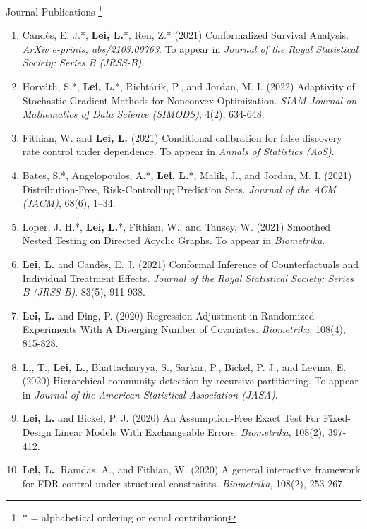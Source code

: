 \documentclass{article}
\begin{document}
\vspace{3mm}

\begin{large}
\noindent Journal Publications \footnote{$\ast$ = alphabetical ordering or equal contribution}
\end{large}

\begin{enumerate}
\item Cand\`{e}s, E. J.*, \textbf{Lei, L.}*, Ren, Z.* (2021) Conformalized Survival Analysis. \emph{ArXiv e-prints, abs/2103.09763}. To appear in \emph{Journal of the Royal Statistical Society: Series B (JRSS-B)}.
\item Horv\'{a}th, S.*, \textbf{Lei, L.}*, Richt\'{a}rik, P., and Jordan, M. I. (2022) Adaptivity of Stochastic Gradient Methods for Nonconvex Optimization. \emph{SIAM Journal on Mathematics of Data Science (SIMODS)}, 4(2), 634-648.
\item Fithian, W. and \textbf{Lei, L.} (2021) Conditional calibration for false discovery rate control under dependence. To appear in \emph{Annals of Statistics (AoS)}.
\item Bates, S.*, Angelopoulos, A.*, \textbf{Lei, L.}*, Malik, J., and Jordan, M. I. (2021) Distribution-Free, Risk-Controlling Prediction Sets. \emph{Journal of the ACM (JACM)}, 68(6), 1–34.
\item Loper, J. H.*, \textbf{Lei, L.}*, Fithian, W., and Tansey, W. (2021) Smoothed Nested Testing on Directed Acyclic Graphs. To appear in \emph{Biometrika}.
\item \textbf{Lei, L.} and Cand\`{e}s, E. J. (2021) Conformal Inference of Counterfactuals and Individual Treatment Effects. \emph{Journal of the Royal Statistical Society: Series B (JRSS-B)}. 83(5), 911-938.
\item \textbf{Lei, L.} and Ding, P. (2020) Regression Adjustment in Randomized Experiments With A Diverging Number of Covariates. \emph{Biometrika}. 108(4), 815-828.
\item Li, T., \textbf{Lei, L.}, Bhattacharyya, S., Sarkar, P., Bickel, P. J., and Levina, E. (2020) Hierarchical community detection by recursive partitioning. To appear in \emph{Journal of the American Statistical Association (JASA)}.
\item \textbf{Lei, L.} and Bickel, P. J. (2020) An Assumption-Free Exact Test For Fixed-Design Linear Models With Exchangeable Errors. \emph{Biometrika}, 108(2), 397-412.
\item \textbf{Lei, L.}, Ramdas, A., and Fithian, W. (2020) A general interactive framework for FDR control under structural constraints. \emph{Biometrika}, 108(2), 253-267.

\end{enumerate}
\end{document}

